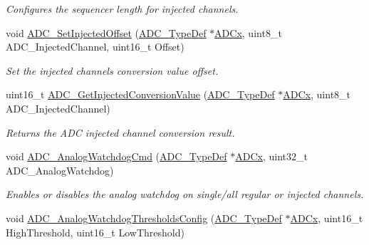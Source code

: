 \begin{DoxyCompactItemize}
\begin{DoxyCompactList}\small\item\em Configures the sequencer length for injected channels. \end{DoxyCompactList}\item 
void \mbox{\hyperlink{group___a_d_c___private___functions_ga07a942613088ab3ecfc3d97a20475920}{A\+D\+C\+\_\+\+Set\+Injected\+Offset}} (\mbox{\hyperlink{struct_a_d_c___type_def}{A\+D\+C\+\_\+\+Type\+Def}} $\ast$\mbox{\hyperlink{group___s_t_m32_f1_x_x___n_u_c_l_e_o___l_o_w___l_e_v_e_l___exported___constants_gab44c1065d38c298955fc028346984340}{A\+D\+Cx}}, uint8\+\_\+t A\+D\+C\+\_\+\+Injected\+Channel, uint16\+\_\+t Offset)
\begin{DoxyCompactList}\small\item\em Set the injected channels conversion value offset. \end{DoxyCompactList}\item 
uint16\+\_\+t \mbox{\hyperlink{group___a_d_c___private___functions_ga1dea5ed24571a2e0ce4cbd41c9c1ec46}{A\+D\+C\+\_\+\+Get\+Injected\+Conversion\+Value}} (\mbox{\hyperlink{struct_a_d_c___type_def}{A\+D\+C\+\_\+\+Type\+Def}} $\ast$\mbox{\hyperlink{group___s_t_m32_f1_x_x___n_u_c_l_e_o___l_o_w___l_e_v_e_l___exported___constants_gab44c1065d38c298955fc028346984340}{A\+D\+Cx}}, uint8\+\_\+t A\+D\+C\+\_\+\+Injected\+Channel)
\begin{DoxyCompactList}\small\item\em Returns the A\+DC injected channel conversion result. \end{DoxyCompactList}\item 
void \mbox{\hyperlink{group___a_d_c___private___functions_gad017d69bec6e497afd35ba25ea22d86e}{A\+D\+C\+\_\+\+Analog\+Watchdog\+Cmd}} (\mbox{\hyperlink{struct_a_d_c___type_def}{A\+D\+C\+\_\+\+Type\+Def}} $\ast$\mbox{\hyperlink{group___s_t_m32_f1_x_x___n_u_c_l_e_o___l_o_w___l_e_v_e_l___exported___constants_gab44c1065d38c298955fc028346984340}{A\+D\+Cx}}, uint32\+\_\+t A\+D\+C\+\_\+\+Analog\+Watchdog)
\begin{DoxyCompactList}\small\item\em Enables or disables the analog watchdog on single/all regular or injected channels. \end{DoxyCompactList}\item 
void \mbox{\hyperlink{group___a_d_c___private___functions_ga79588d02aa8e4147f21cb90a4708366d}{A\+D\+C\+\_\+\+Analog\+Watchdog\+Thresholds\+Config}} (\mbox{\hyperlink{struct_a_d_c___type_def}{A\+D\+C\+\_\+\+Type\+Def}} $\ast$\mbox{\hyperlink{group___s_t_m32_f1_x_x___n_u_c_l_e_o___l_o_w___l_e_v_e_l___exported___constants_gab44c1065d38c298955fc028346984340}{A\+D\+Cx}}, uint16\+\_\+t High\+Threshold, uint16\+\_\+t Low\+Threshold)

\end{DoxyCompactItemize}
